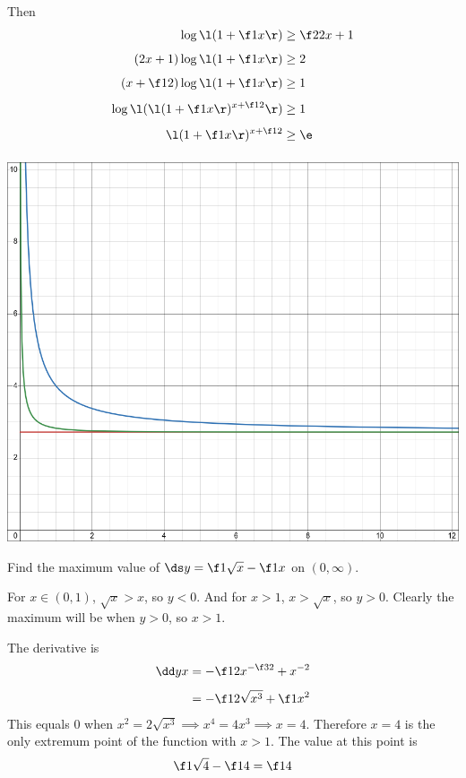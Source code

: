 \documentclass[a4paper]{article}
\begin{document}
Then \begin{align*}
\log\l( 1 + \f1x \r) &\ge \f2{2x+1}\\[1ex]
(2x+1) \log\l( 1 + \f1x \r) &\ge 2\\[1ex]
(x + \f12) \log\l( 1 + \f1x \r) &\ge 1\\[1ex]
\log\l( \l( 1 + \f1x \r)^{x + \f12} \r) &\ge 1\\[1ex]
\l( 1 + \f1x \r)^{x + \f12} &\ge \e\\[1ex]
\end{align*}

\begin{center}
	\includegraphics[scale=0.3]{Q1-graph.png}
\end{center}



\begin{questionbody}
Find the maximum value of $\ds y = \f1{\sqrt x} - \f1x$ on $(0, \infty)$.
\end{questionbody}

For $x \in (0,1)$, $\sqrt x > x$, so $y < 0$. And for $x > 1$, $x > \sqrt x$, so $y > 0$. Clearly the maximum will be when $y > 0$, so $x > 1$.

The derivative is \begin{align*}
\dd yx &= -\f12 x^{-\f32} + x^{-2}\\[1ex]
&= - \f1{2\sqrt{x^3}} + \f1{x^2}
\end{align*}
This equals 0 when $x^2 = 2 \sqrt{x^3} \implies x^4 = 4x^3 \implies x = 4$. Therefore $x = 4$ is the only extremum point of the function with $x > 1$. The value at this point is $$\f1{\sqrt 4} - \f14 = \f14$$
\end{document}
